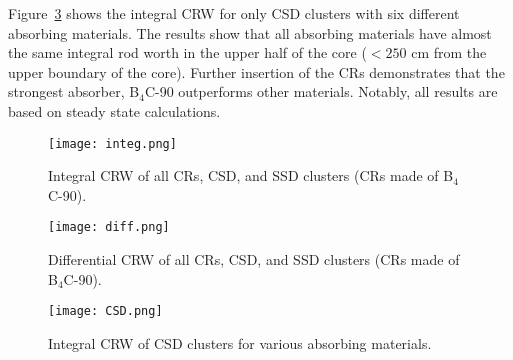 Figure~\ref{fig:CSD} shows the integral CRW for only CSD clusters with six 
different absorbing materials. The results show that all absorbing materials 
have almost the same integral rod worth in the upper half of the core 
($<250$ cm from the upper boundary of the core). Further insertion of the 
CRs demonstrates that the strongest absorber, B$_4$C-90 outperforms other materials.
Notably, all results are based on steady state calculations. 

\begin{figure}
	\centering
	\texttt{[image: integ.png]}
	\vspace{-0.5in}
	\caption{Integral CRW of all CRs, CSD, and SSD clusters (CRs made of B$_4$C-90).} 
	\label{fig:integ}
\end{figure}
\begin{figure}
	\centering
	\texttt{[image: diff.png]}
	\vspace{-0.5in}
	\caption{Differential CRW of all CRs, CSD, and SSD clusters (CRs made of B$_4$C-90).} 
	\label{fig:diff}
\end{figure}
\begin{figure}
	\centering
	\texttt{[image: CSD.png]}
	\vspace{-0.5in}
	\caption{Integral CRW of CSD clusters for various absorbing materials.} 
	\label{fig:CSD}
\end{figure}